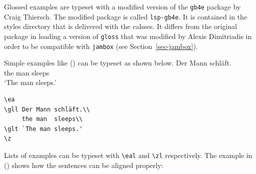 Glossed examples are typeset with a modified version of the \texttt{gb4e} package by Craig
Thiersch. The modified package is called \texttt{lsp-gb4e}. It is contained in the styles directory
that is delivered with the \lsp \latex calsses. It differs from the original package in loading a
version of \texttt{gloss} that was modified by Alexis Dimitriadis in order to be compatible with
\texttt{jambox} (see Section~\ref{sec-jambox}).

Simple examples like () can be typeset as shown below.
\ea
{}
\gll Der Mann schläft.\\
     the man  sleeps\\
\glt `The man sleeps.'
\z
\begin{verbatim}
\ea
\gll Der Mann schläft.\\
     the man  sleeps\\
\glt `The man sleeps.'
\z
\end{verbatim}
Lists of examples can be typeset with \verb+\eal+ and \verb+\zl+ respectively. The example in
() shows how the sentences can be aligned properly:
\eal
{}
\zl
\begin{fitverb}
\eal
{}
\zl
\end{fitverb}

